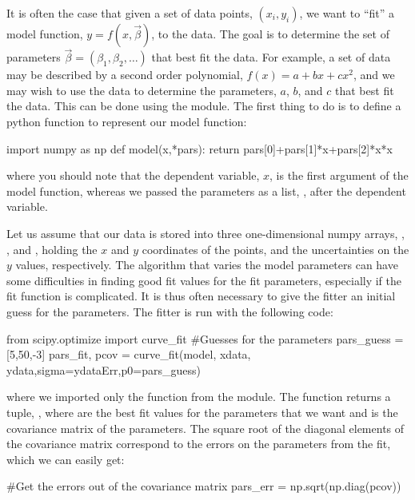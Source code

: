 It is often the case that given a set of data points, $(x_i,y_i)$, we want to ``fit'' a model function, $y=f(x,\vec\beta)$, to the data. The goal is to determine the set of parameters $\vec\beta=(\beta_1, \beta_2,\dots)$ that best fit the data. For example, a set of data may be described by a second order polynomial, $f(x)=a+bx+cx^2$, and we may wish to use the data to determine the parameters, $a$, $b$, and $c$ that best fit the data. This can be done using the  module. The first thing to do is to define a python function to represent our model function:
\begin{python}[caption = \mbox{}]
import numpy as np
def model(x,*pars):
    return pars[0]+pars[1]*x+pars[2]*x*x
\end{python}
where you should note that the dependent variable, $x$, is the first argument of the model function, whereas we passed the parameters as a list, , after the dependent variable.

Let us assume that our data is stored into three one-dimensional numpy arrays, , , and , holding the $x$ and $y$ coordinates of the points, and the uncertainties on the $y$ values, respectively. The algorithm that varies the model parameters can have some difficulties in finding good fit values for the fit parameters, especially if the fit function is complicated. It is thus often necessary to give the fitter an initial guess for the parameters. The fitter is run with the following code:

\begin{python}[caption = \mbox{}]
from scipy.optimize import curve_fit
#Guesses for the parameters
pars_guess = [5,50,-3]
pars_fit, pcov = curve_fit(model, xdata, ydata,sigma=ydataErr,p0=pars_guess)
\end{python}
where we imported only the  function from the  module. The  function returns a tuple, , where  are the best fit values for the parameters that we want and  is the covariance matrix of the parameters. The square root of the diagonal elements of the covariance matrix correspond to the errors on the parameters from the fit, which we can easily get:
\begin{python}[caption = \mbox{}]
#Get the errors out of the covariance matrix
pars_err = np.sqrt(np.diag(pcov))
\end{python}

